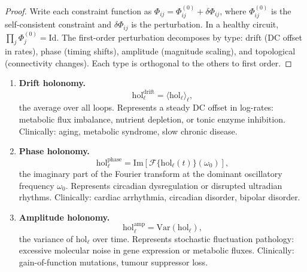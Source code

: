 \begin{proof}
Write each constraint function as
$\Phi_{ij} = \Phi_{ij}^{(0)} + \delta\Phi_{ij}$,
where $\Phi_{ij}^{(0)}$ is the self-consistent constraint and
$\delta\Phi_{ij}$ is the perturbation.  In a healthy circuit,
$\prod_j \Phi_j^{(0)} = \mathrm{Id}$.  The first-order perturbation
decomposes by type: drift (DC offset in rates), phase (timing shifts),
amplitude (magnitude scaling), and topological (connectivity changes).
Each type is orthogonal to the others to first order.
\end{proof}

\begin{enumerate}[label=(\arabic*), itemsep=4pt]
  \item \textbf{Drift holonomy.}
        \begin{equation}
          \mathrm{hol}_{\ell}^{\mathrm{drift}}
          = \bigl\langle \mathrm{hol}_\ell \bigr\rangle_\ell,
          \label{eq:drift-hol}
        \end{equation}
        the average over all loops.  Represents a steady DC offset in
        log-rates: metabolic flux imbalance, nutrient depletion, or tonic
        enzyme inhibition.  Clinically: aging, metabolic syndrome, slow
        chronic disease.

  \item \textbf{Phase holonomy.}
        \begin{equation}
          \mathrm{hol}_{\ell}^{\mathrm{phase}}
          = \mathrm{Im}\!\left[\mathcal{F}\{\mathrm{hol}_\ell(t)\}(\omega_0)\right],
          \label{eq:phase-hol}
        \end{equation}
        the imaginary part of the Fourier transform at the dominant
        oscillatory frequency $\omega_0$.  Represents circadian
        dysregulation or disrupted ultradian rhythms.  Clinically: cardiac
        arrhythmia, circadian disorder, bipolar disorder.

  \item \textbf{Amplitude holonomy.}
        \begin{equation}
          \mathrm{hol}_{\ell}^{\mathrm{amp}}
          = \mathrm{Var}\!\left(\mathrm{hol}_\ell\right),
          \label{eq:amp-hol}
        \end{equation}
        the variance of $\mathrm{hol}_\ell$ over time.  Represents stochastic
        fluctuation pathology: excessive molecular noise in gene expression
        or metabolic fluxes.  Clinically: gain-of-function mutations,
        tumour suppressor loss.


\end{enumerate}
